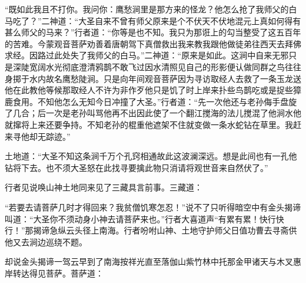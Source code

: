 \documentclass[12pt,UTF8]{ctexbook}
\begin{document}
{“既如此我且不打你。我问你：鹰愁涧里是那方来的怪龙？他怎么抢了我师父的白马吃了？”二神道：“大圣自来不曾有师父原来是个不伏天不伏地混元上真如何得有甚么师父的马来？”行者道：“你等是也不知。我只为那诳上的勾当整受了这五百年的苦难。今蒙观音菩萨劝善着唐朝驾下真僧救出我来教我跟他做徒弟往西天去拜佛求经。因路过此处失了我师父的白马。”二神道：“原来是如此。这涧中自来无邪只是深陡宽阔水光彻底澄清鸦鹊不敢飞过因水清照见自己的形影便认做同群之鸟往往身掷于水内故名鹰愁陡涧。只是向年间观音菩萨因为寻访取经人去救了一条玉龙送他在此教他等候那取经人不许为非作歹他只是饥了时上岸来扑些鸟鹊吃或是捉些獐鹿食用。不知他怎么无知今日冲撞了大圣。”行者道：“先一次他还与老孙侮手盘旋了几合；后一次是老孙叫骂他再不出因此使了一个翻江搅海的法儿搅混了他涧水他就撺将上来还要争持。不知老孙的棍重他遮架不住就变做一条水蛇钻在草里。我赶来寻他却无踪迹。”

土地道：“大圣不知这条涧千万个孔窍相通故此这波澜深远。想是此间也有一孔他钻将下去。也不须大圣怒在此找寻要擒此物只消请将观世音来自然伏了。”

行者见说唤山神土地同来见了三藏具言前事。三藏道：

“若要去请菩萨几时才得回来？我贫僧饥寒怎忍！”说不了只听得暗空中有金头揭谛叫道：“大圣你不须动身小神去请菩萨来也。”行者大喜道声“有累有累！快行快行！”那揭谛急纵云头径上南海。行者吩咐山神、土地守护师父日值功曹去寻斋供他又去涧边巡绕不题。

却说金头揭谛一驾云早到了南海按祥光直至落伽山紫竹林中托那金甲诸天与木叉惠岸转达得见菩萨。菩萨道：

}
\end{document}
